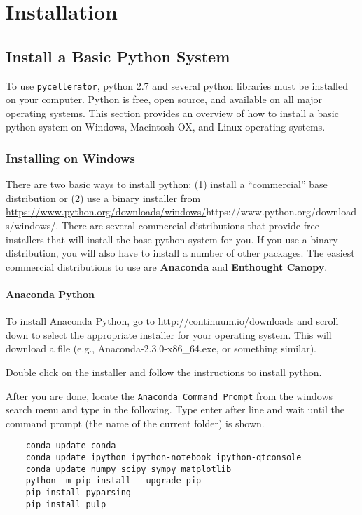 
\chapter{Installation}

\section[Install Python]{Install a Basic Python System}

To use {\tt pycellerator}, python 2.7 and several python libraries must be installed on your computer. Python is free, open source, and available on all major operating systems.  This section provides an overview of how to install a basic python system on Windows, Macintosh OX, and Linux operating systems. 

\subsection{Installing on Windows}

There are two basic ways to install python: (1) install a ``commercial'' base distribution or (2) use a binary installer from  \url{https://www.python.org/downloads/windows/}{https://www.python.org/downloads/windows/}. There are several commercial distributions that provide free installers that will install the base python system for you. If you use a binary distribution, you will also have to install a number of other packages. The easiest commercial distributions to use are \textbf{Anaconda} and \textbf{Enthought Canopy}. 

\subsubsection{Anaconda Python}

To install Anaconda Python, go to \href{http://continuum.io/downloads}{http://continuum.io/downloads} and scroll down to select the appropriate installer for your operating system. This will download a file (e.g., Anaconda-2.3.0-x86\_64.exe, or something similar). 

Double click on the installer and follow the instructions to install python. 

After you are done, locate the {\tt Anaconda Command Prompt} from the windows search menu and type in the following. Type enter after line and wait until the command prompt (the name of the current folder)  is shown. 
\begin{verbatim}
    conda update conda
    conda update ipython ipython-notebook ipython-qtconsole
    conda update numpy scipy sympy matplotlib
    python -m pip install --upgrade pip
    pip install pyparsing
    pip install pulp
\end{verbatim}

